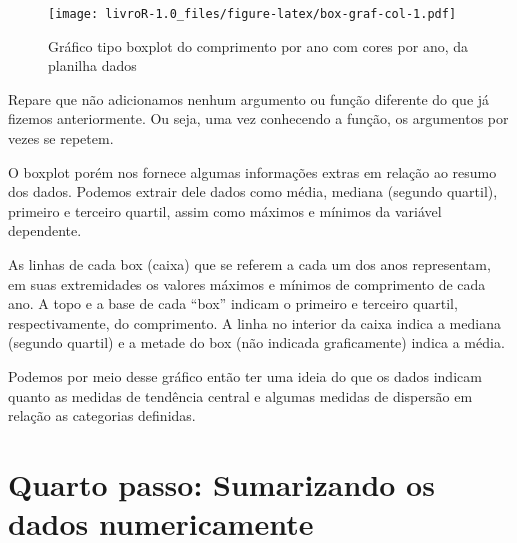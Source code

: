 \documentclass[]{book}
\newenvironment{Shaded}{\begin{snugshade}}{\end{snugshade}}
\newcommand{\DataTypeTok}[1]{\textcolor[rgb]{0.13,0.29,0.53}{#1}}
\newcommand{\KeywordTok}[1]{\textcolor[rgb]{0.13,0.29,0.53}{\textbf{#1}}}
\newcommand{\NormalTok}[1]{#1}
\newcommand{\OperatorTok}[1]{\textcolor[rgb]{0.81,0.36,0.00}{\textbf{#1}}}
\newcommand{\StringTok}[1]{\textcolor[rgb]{0.31,0.60,0.02}{#1}}
\begin{document}
\begin{Shaded}
\end{Shaded}

\begin{figure}
\centering
\texttt{[image: livroR-1.0\_files/figure-latex/box-graf-col-1.pdf]}
\caption{\label{fig:box-graf-col}Gráfico tipo boxplot do comprimento por ano com cores por ano, da planilha dados}
\end{figure}

Repare que não adicionamos nenhum argumento ou função diferente do que já fizemos anteriormente. Ou seja, uma vez conhecendo a função, os argumentos por vezes se repetem.

O boxplot porém nos fornece algumas informações extras em relação ao resumo dos dados. Podemos extrair dele dados como média, mediana (segundo quartil), primeiro e terceiro quartil, assim como máximos e mínimos da variável dependente.

As linhas de cada box (caixa) que se referem a cada um dos anos representam, em suas extremidades os valores máximos e mínimos de comprimento de cada ano. A topo e a base de cada ``box'' indicam o primeiro e terceiro quartil, respectivamente, do comprimento. A linha no interior da caixa indica a mediana (segundo quartil) e a metade do box (não indicada graficamente) indica a média.

Podemos por meio desse gráfico então ter uma ideia do que os dados indicam quanto as medidas de tendência central e algumas medidas de dispersão em relação as categorias definidas.

\hypertarget{quarto-passo-sumarizando-os-dados-numericamente}{%
\section{Quarto passo: Sumarizando os dados numericamente}\label{quarto-passo-sumarizando-os-dados-numericamente}}
\end{document}
